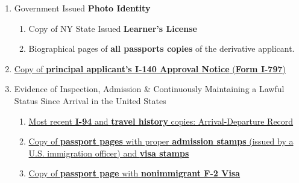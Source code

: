 \begin{enumerate}[label=\textbf{ Exhibit-\arabic*},start=15]

    
   

 
     \item {Government Issued \textbf{Photo Identity}}\begin{enumerate}[label=\roman*.]
        \item Copy of NY State Issued \textbf{Learner's License}
        \item Biographical pages of \textbf{all passports copies} of the derivative applicant.
    \end{enumerate}
    
    \item \hyperref[exhibit1]{Copy of \textbf{principal applicant's I-140 Approval Notice} (\textbf{Form I-797})}
    
    
    \item Evidence of Inspection, Admission \& Continuously Maintaining a Lawful Status Since Arrival in the United States
    \begin{enumerate}[label=\roman*.]
        \item \hyperref[exhibit6c]{Most recent \textbf{I-94} and \textbf{travel history} copies: Arrival-Departure Record}
        \item \hyperref[exhibit6a]{Copy of \textbf{passport pages} with proper \textbf{admission stamps} (issued by a U.S. immigration officer) and \textbf{visa stamps} }
        \item \hyperref[exhibit6b]{Copy of \textbf{passport page} with \textbf{nonimmigrant F-2 Visa}}
        

\end{enumerate}
\end{enumerate}
